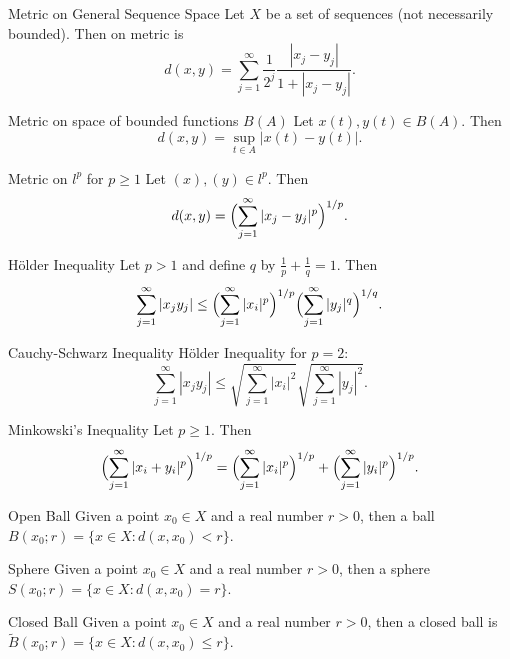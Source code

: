 \documentclass[avery5388,grid,frame]{flashcards}
\begin{document}
\begin{flashcard}[Example]{Metric on General Sequence Space}
Let $X$ be a set of sequences (not necessarily bounded). Then on metric is
\[d(x,y)=\sum_{j=1}^\infty\frac{1}{2^j}\frac{|x_j-y_j|}{1+|x_j-y_j|}.\]
\end{flashcard}

\begin{flashcard}[Example]{Metric on space of bounded functions $B(A)$}
Let $x(t),y(t)\in B(A)$. Then \[d(x,y)=\sup_{t\in A}|x(t)-y(t)|.\]
\end{flashcard}

\begin{flashcard}[Example]{Metric on $l^p$ for $p\geq 1$}
Let $(x),(y)\in l^p$. Then
\[d(x,y)=\Bigl(\sum_{j=1}^\infty|x_j-y_j|^p\Bigr)^{1/p}.\]
\end{flashcard}

\begin{flashcard}[Theorem]{H\"{o}lder Inequality}
Let $p>1$ and define $q$ by $\frac{1}{p}+\frac{1}{q}=1$. Then 
\[\sum_{j=1}^\infty|x_jy_j|\leq\Bigl(\sum_{j=1}^\infty|x_i|^p\Bigr)^{1/p}\Bigl(\sum_{j=1}^\infty|y_j|^q\Bigr)^{1/q}.\]
\end{flashcard}

\begin{flashcard}[Theorem]{Cauchy-Schwarz Inequality}
H\"{o}lder Inequality for $p=2$:
\[\sum_{j=1}^\infty|x_jy_j|\leq\sqrt{\sum_{j=1}^\infty|x_i|^2}\sqrt{\sum_{j=1}^\infty|y_j|^2}.\]
\end{flashcard}

\begin{flashcard}[Theorem]{Minkowski's Inequality}
Let $p\geq 1$. Then
\[\Bigl(\sum_{j=1}^\infty|x_i+y_i|^p\Bigr)^{1/p}=\Bigl(\sum_{j=1}^\infty|x_i|^p\Bigr)^{1/p}+\Bigl(\sum_{j=1}^\infty|y_i|^p\Bigr)^{1/p}.\]
\end{flashcard}

\begin{flashcard}[Definition]{Open Ball}
Given a point $x_0\in X$ and a real number $r>0$, then a ball $B(x_0;r)=\{x\in X\colon d(x,x_0)<r\}$.
\end{flashcard}

\begin{flashcard}[Definition]{Sphere}
Given a point $x_0\in X$ and a real number $r>0$, then a sphere $S(x_0;r)=\{x\in X\colon d(x,x_0)=r\}$.
\end{flashcard}

\begin{flashcard}[Definition]{Closed Ball}
Given a point $x_0\in X$ and a real number $r>0$, then a closed ball is $\widetilde{B}(x_0;r)=\{x\in X\colon d(x,x_0)\leq r\}$.
\end{flashcard}
\end{document}
